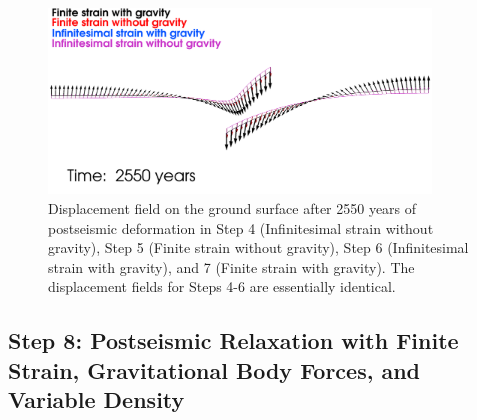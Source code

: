 \begin{figure}
  \includegraphics[width=4in]{examples/figs/grav2d_postseismic_dispcmp}
  \caption{Displacement field on the ground surface after 2550 years
    of postseismic deformation in Step 4 (Infinitesimal strain without
    gravity), Step 5 (Finite strain without gravity), Step 6
    (Infinitesimal strain with gravity), and 7 (Finite strain with
    gravity). The displacement fields for Steps 4-6 are essentially
    identical.}
  \label{fig:examples:gravity:2d:postseismic:groundsurf}
\end{figure}


\subsection{Step 8: Postseismic Relaxation with Finite Strain, Gravitational
Body Forces, and Variable Density}

